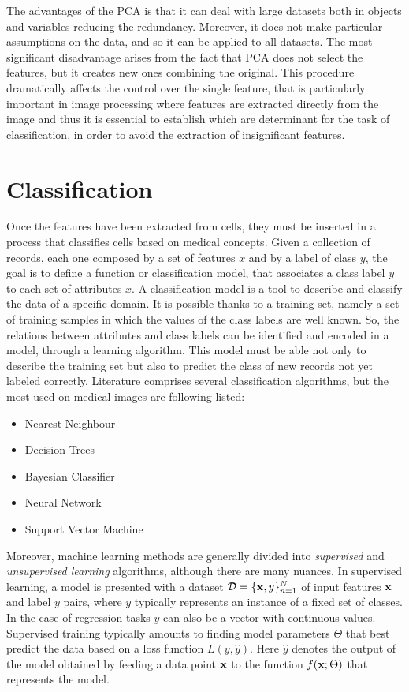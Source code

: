 \documentclass[final,a4paper,12pt,english]{UnicaPhdThesis3}
\begin{document}
The advantages of the PCA is that it can deal with large datasets both in objects and variables reducing the redundancy. Moreover, it does not make particular assumptions on the data, and so it can be applied to all datasets. The most significant disadvantage arises from the fact that PCA does not select the features, but it creates new ones combining the original. This procedure dramatically affects the control over the single feature, that is particularly important in image processing where features are extracted directly from the image and thus it is essential to establish which are determinant for the task of classification, in order to avoid the extraction of insignificant features.  

\chapter{Classification}
Once the features have been extracted from cells, they must be inserted in a process that classifies cells based on medical concepts. Given a collection of records, each one composed by a set of features $x$ and by a label of class $y$, the goal is to define a function or classification model, that associates a class label $y$ to each set of attributes $x$. A classification model is a tool to describe and classify the data of a specific domain. It is possible thanks to a training set, namely a set of training samples in which the values ​​of the class labels are well known. So, the relations between attributes and class labels can be identified and encoded in a model, through a learning algorithm. This model must be able not only to describe the training set but also to predict the class of new records not yet labeled correctly. Literature comprises several classification algorithms, but the most used on medical images are following listed:
\begin{itemize}
	\item Nearest Neighbour
	\item Decision Trees
	\item Bayesian Classifier    
	\item Neural Network
	\item Support Vector Machine
\end{itemize}
Moreover, machine learning methods are generally divided into {\it supervised} and {\it unsupervised learning} algorithms, although there are many nuances. In supervised learning, a model is presented with a dataset $\mathcal{D} = \{{\bf x}, y\}^{N}_{n = 1}$ of input features ${\bf x}$ and label $y$ pairs, where $y$ typically represents an instance of a fixed set of classes. In the case of regression tasks $y$ can also be a vector with continuous values. Supervised training typically amounts to finding model parameters $\Theta$ that best predict the data based on a loss function $L(y, \hat{y})$. Here $\hat{y}$ denotes the output of the model obtained by feeding a data point ${\bf x}$ to the function $f({\bf x}; \Theta)$ that represents the model.
\end{document}
